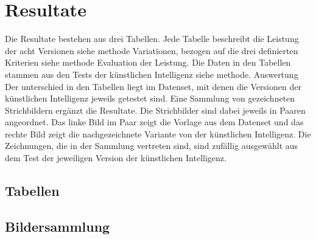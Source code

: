 \chapter{Resultate}
Die Resultate bestehen aus drei Tabellen. Jede Tabelle beschreibt die Leistung
der acht Versionen {siehe methode Variationen}, bezogen auf die drei definierten
Kriterien {siehe methode Evaluation der Leistung}. Die Daten in den Tabellen
stammen aus den Tests der künstlichen Intelligenz {siehe methode. Auswertung}
Der unterschied in den Tabellen liegt im Datenset, mit denen die Versionen der
künstlichen Intelligenz jeweils getestet sind. 
Eine Sammlung von gezeichneten Strichbildern ergänzt die Resultate. Die
Strichbilder sind dabei jeweils in Paaren angeordnet. Das linke Bild im Paar
zeigt die Vorlage aus dem Datenset und das rechte Bild zeigt die nachgezeichnete
Variante von der künstlichen Intelligenz. Die Zeichnungen, die in der Sammlung
vertreten sind, sind zufällig ausgewählt aus dem Test der jeweiligen Version der
künstlichen Intelligenz.


\section{Tabellen}


\section{Bildersammlung}
